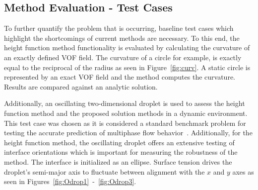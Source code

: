 \subsection{Method Evaluation - Test Cases}
To further quantify the problem that is occurring, baseline test cases which highlight the shortcomings of current methods are necessary. To this end, the height function method functionality is evaluated by calculating the curvature of an exactly defined VOF field. The curvature of a circle for example, is exactly equal to the reciprocal of the radius as seen in Figure~\ref{fig:curv}. A static circle is represented by an exact VOF field and the method computes the curvature. Results are compared against an analytic solution. 

Additionally, an oscillating two-dimensional droplet is used to assess the height function method and the proposed solution methods in a dynamic environment. This test case was chosen as it is considered a standard benchmark problem for testing the accurate prediction of multiphase flow behavior~\cite{Salih2002}. Additionally, for the height function method, the oscillating droplet offers an extensive testing of interface orientations which is important for measuring the robustness of the method. The interface is initialized as an ellipse. Surface tension drives the droplet's semi-major axis to fluctuate between alignment with the $x$ and $y$ axes as seen in Figures~\ref{fig:Odrop1}~-~\ref{fig:Odrop3}. 
